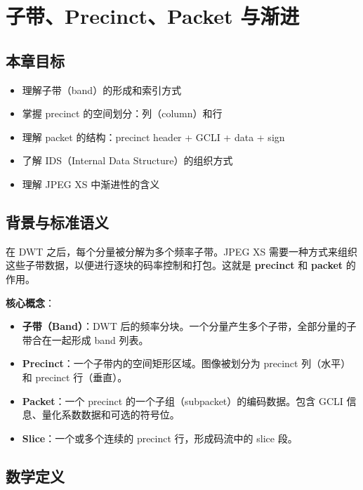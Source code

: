 
\chapter{子带、Precinct、Packet 与渐进}\label{ch:bands-precincts}

\section{本章目标}

\begin{itemize}
  \item 理解子带（band）的形成和索引方式
  \item 掌握 precinct 的空间划分：列（column）和行
  \item 理解 packet 的结构：precinct header + GCLI + data + sign
  \item 了解 IDS（Internal Data Structure）的组织方式
  \item 理解 JPEG XS 中渐进性的含义
\end{itemize}

\section{背景与标准语义}

在 DWT 之后，每个分量被分解为多个频率子带。JPEG XS 需要一种方式来组织这些子带数据，以便进行逐块的码率控制和打包。这就是 \textbf{precinct} 和 \textbf{packet} 的作用。

\textbf{核心概念}：
\begin{itemize}
  \item \textbf{子带（Band）}：DWT 后的频率分块。一个分量产生多个子带，全部分量的子带合在一起形成 band 列表。
  \item \textbf{Precinct}：一个子带内的空间矩形区域。图像被划分为 precinct 列（水平）和 precinct 行（垂直）。
  \item \textbf{Packet}：一个 precinct 的一个子组（subpacket）的编码数据。包含 GCLI 信息、量化系数数据和可选的符号位。
  \item \textbf{Slice}：一个或多个连续的 precinct 行，形成码流中的 slice 段。
\end{itemize}

\section{数学定义}

